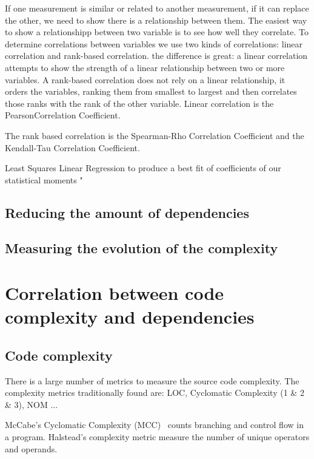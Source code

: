 \documentclass{sig-alternate}
\begin{document}
If one measurement is similar or related to another measurement, if it can replace the other, we need to show there is a relationship between them. The easiest way to show a relationshipp between two variable is to see how well they correlate. To determine correlations between variables we use two kinds of correlations: linear correlation and rank-based correlation. the difference is great: a linear correlation attempts to show the strength of a linear relationship between two or more variables. A rank-based correlation does not rely on a linear relationship, it orders the variables, ranking them from smallest to largest and then correlates those ranks with the rank of the other variable. 
Linear correlation is the PearsonCorrelation Coefficient. 

The rank based correlation is the Spearman-Rho Correlation Coefficient and the Kendall-Tau Correlation Coefficient. 

Least Squares Linear Regression to produce a best fit of coefficients of our statistical moments
"






\subsection{Reducing the amount of dependencies}

\subsection{Measuring the evolution of the complexity}


\section{Correlation between code complexity and dependencies}

\subsection{Code complexity}
There is a large number of metrics to measure the source code complexity.
The complexity metrics traditionally found are: LOC, Cyclomatic Complexity (1 \& 2 \& 3), NOM ...

McCabe's Cyclomatic Complexity (MCC)~\cite{McCa76a} counts branching and control flow in a program.
Halstead's complexity metric measure the number of unique operators and operands. 
\end{document}

